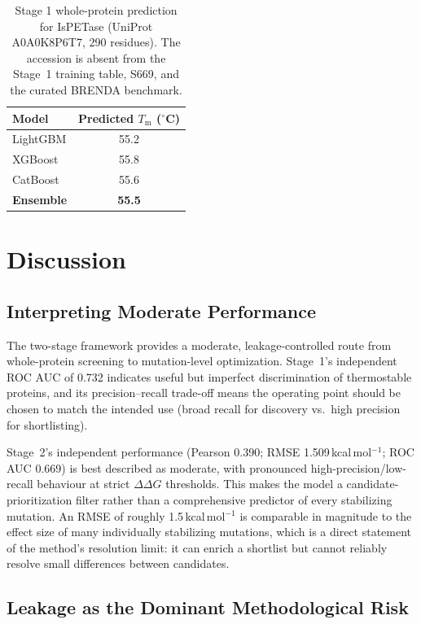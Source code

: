 \documentclass[journal,article,submit,moreauthors]{Definitions/mdpi}
\newcommand{\ddg}{\ensuremath{\Delta\Delta G}}
\newcommand{\Tm}{\ensuremath{T_\mathrm{m}}}
\newcommand{\kcal}{\,kcal\,mol$^{-1}$}
\begin{document}
\begin{table}[H]
\caption{Stage 1 whole-protein prediction for IsPETase (UniProt A0A0K8P6T7, 290 residues).
The accession is absent from the Stage~1 training table, S669, and the curated BRENDA
benchmark.}
\label{tab:ispetase}
\begin{tabular}{lc}
\toprule
\textbf{Model} & \textbf{Predicted \Tm{} ($^{\circ}$C)}\\
\midrule
LightGBM  & 55.2\\
XGBoost   & 55.8\\
CatBoost  & 55.6\\
\midrule
\textbf{Ensemble} & \textbf{55.5}\\
\bottomrule
\end{tabular}
\end{table}

\section{Discussion}

\subsection{Interpreting Moderate Performance}

The two-stage framework provides a moderate, leakage-controlled route from whole-protein
screening to mutation-level optimization. Stage~1's independent ROC AUC of 0.732 indicates
useful but imperfect discrimination of thermostable proteins, and its precision--recall
trade-off means the operating point should be chosen to match the intended use (broad
recall for discovery vs.\ high precision for shortlisting).

Stage~2's independent performance (Pearson 0.390; RMSE 1.509\kcal; ROC AUC 0.669) is best
described as moderate, with pronounced high-precision/low-recall behaviour at strict \ddg{}
thresholds. This makes the model a candidate-prioritization filter rather than a
comprehensive predictor of every stabilizing mutation. An RMSE of roughly 1.5\kcal{} is
comparable in magnitude to the effect size of many individually stabilizing mutations,
which is a direct statement of the method's resolution limit: it can enrich a shortlist but
cannot reliably resolve small differences between candidates.

\subsection{Leakage as the Dominant Methodological Risk}
\end{document}
